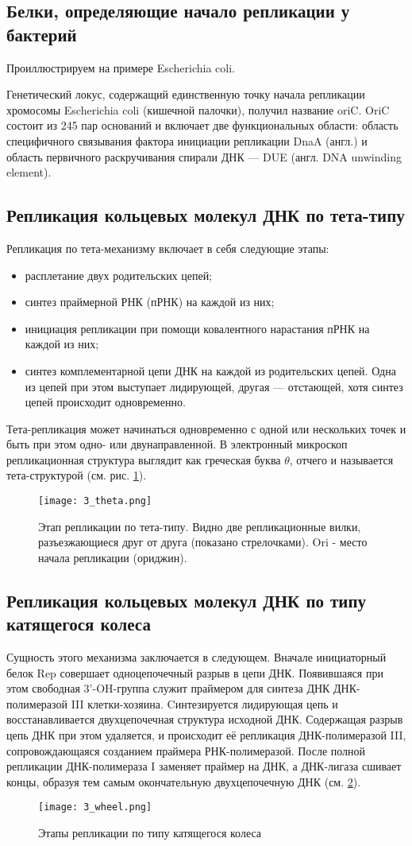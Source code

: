 \subsection{Белки, определяющие начало репликации у бактерий}

Проиллюстрируем на примере Escherichia coli.

Генетический локус, содержащий единственную точку начала репликации хромосомы Escherichia coli (кишечной палочки), получил название oriC. OriC состоит из 245 пар оснований и включает две функциональных области: область специфичного связывания фактора инициации репликации DnaA (англ.) и область первичного раскручивания спирали ДНК — DUE (англ. DNA unwinding element). 

\subsection{Репликация кольцевых молекул ДНК по тета-типу}
Репликация по тета-механизму включает в себя следующие этапы:
\begin{itemize}
    \item 
    расплетание двух родительских цепей;
    \item
    синтез праймерной РНК (пРНК) на каждой из них;
    \item
    инициация репликации при помощи ковалентного нарастания пРНК на каждой из них;
    \item
    синтез комплементарной цепи ДНК на каждой из родительских цепей. Одна из цепей при этом выступает лидирующей, другая — отстающей, хотя синтез цепей происходит одновременно.
\end{itemize}

Тета-репликация может начинаться одновременно с одной или нескольких точек и быть при этом одно- или двунаправленной. В электронный микроскоп репликационная структура выглядит как греческая буква \(\theta\), отчего и называется тета-структурой (см. рис. \ref{fig:3_theta}).

\begin{figure}[H]
    \centering
    \texttt{[image: 3\_theta.png]}
    \caption{Этап репликации по тета-типу. Видно две репликационные вилки, разъезжающиеся друг от друга (показано стрелочками). Ori - место начала репликации (ориджин).}
    \label{fig:3_theta}
\end{figure}

\subsection{Репликация кольцевых молекул ДНК по типу катящегося колеса}
Сущность этого механизма заключается в следующем. Вначале инициаторный белок Rep совершает одноцепочечный разрыв в цепи ДНК. Появившаяся при этом свободная 3'-OH-группа служит праймером для синтеза ДНК ДНК-полимеразой III клетки-хозяина. Cинтезируется лидирующая цепь и восстанавливается двухцепочечная структура исходной ДНК. Содержащая разрыв цепь ДНК при этом удаляется, и происходит её репликация ДНК-полимеразой III, сопровождающаяся созданием праймера РНК-полимеразой. После полной репликации ДНК-полимераза I заменяет праймер на ДНК, а ДНК-лигаза сшивает концы, образуя тем самым окончательную двухцепочечную ДНК (см. \ref{fig:3_wheel}).

\begin{figure}[H]
    \centering
    \texttt{[image: 3\_wheel.png]}
    \caption{Этапы репликации по типу катящегося колеса}
    \label{fig:3_wheel}
\end{figure}
